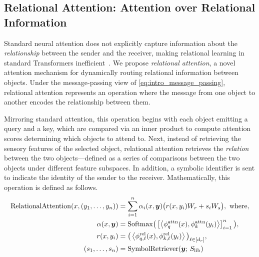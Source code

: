 \subsection{Relational Attention: Attention over Relational Information}

Standard neural attention does not explicitly capture information about the \textit{relationship} between the sender and the receiver, making relational learning in standard Transformers inefficient~\citep{lake2018generalization,barrett2018measuring,santoroSimpleNeuralNetwork2017,santoroRelationalRecurrentNeural2018,shanahanExplicitlyRelationalNeurala,webbEmergentSymbolsBinding2021,webbRelationalBottleneckInductive2024,kergNeuralArchitectureInductive2022,altabaa2024abstractors,altabaaLearningHierarchicalRelational2024}. We propose \textit{relational attention}, a novel attention mechanism for dynamically routing relational information between objects. Under the message-passing view of \cref{eq:intro_message_passing}, relational attention represents an operation where the message from one object to another encodes the relationship between them.

Mirroring standard attention, this operation begins with each object emitting a query and a key, which are compared via an inner product to compute attention scores determining which objects to attend to. Next, instead of retrieving the sensory features of the selected object, relational attention retrieves the \textit{relation} between the two objects---defined as a series of comparisons between the two objects under different feature subspaces. In addition, a symbolic identifier is sent to indicate the identity of the sender to the receiver. Mathematically, this operation is defined as follows.
\begin{equation}\label{eq:rel_attn}
  \begin{split}
    \mathrm{RelationalAttention}(x, (y_1, \ldots, y_n)) &= \sum_{i=1}^{n} \alpha_i(x, \bm{y}) \big(r(x, y_i) W_r + s_i W_s\big), \ \text{where},\\
    \alpha(x, \bm{y}) &= \mathrm{Softmax}\big(\left[\left \langle \phi_q^{\mathrm{attn}}(x), \phi_k^{\mathrm{attn}}(y_i) \right\rangle\right]_{i=1}^{n}\big), \\
    r(x, y_i) &= \big(\left \langle \phi_{q, \ell}^{\mathrm{rel}}(x), \phi_{k, \ell}^{\mathrm{rel}}(y_i) \right\rangle\big)_{\ell \in [d_r]}, \\
    (s_1, \ldots, s_n) &= \mathrm{SymbolRetriever}(\bm{y};\,S_\mathrm{lib})
  \end{split}
\end{equation}

